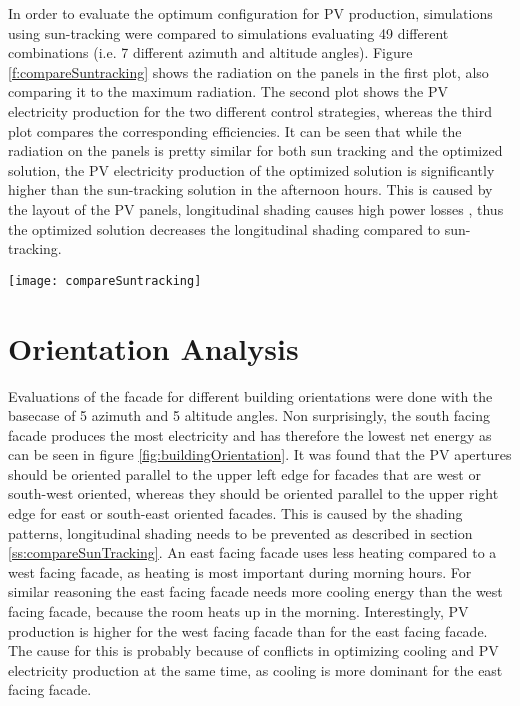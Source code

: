 		In order to evaluate the optimum configuration for PV production, simulations using sun-tracking were compared to simulations evaluating 49 different combinations (i.e. 7 different azimuth and altitude angles). Figure \ref{f:compareSuntracking} shows the radiation on the panels in the first plot, also comparing it to the maximum radiation. The second plot shows the PV electricity production for the two different control strategies, whereas the third plot compares the corresponding efficiencies. It can be seen that while the radiation on the panels is pretty similar for both sun tracking and the optimized solution, the PV electricity production of the optimized solution is significantly higher than the sun-tracking solution in the afternoon hours. This is caused by the layout of the PV panels, longitudinal shading causes high power losses \cite{hofer2015PVSEC}, thus the optimized solution decreases the longitudinal shading compared to sun-tracking. 

		\begin{figure*}
			\begin{center}
			\texttt{[image: compareSuntracking]}
			\caption{Comparison of optimized solution to sun-tracking. a) average radiation on panels compared to radiation without shading b) PV electricity production comparison c) efficiency comparison}
			\label{f:compareSuntracking}
			\end{center}
		\end{figure*}






\section{Orientation Analysis}

	Evaluations of the facade for different building orientations were done with the basecase of 5 azimuth and 5 altitude angles. Non surprisingly, the south facing facade produces the most electricity and has therefore the lowest net energy as can be seen in figure \ref{fig:buildingOrientation}. It was found that the PV apertures should be oriented parallel to the upper left edge for facades that are west or south-west oriented, whereas they should be oriented parallel to the upper right edge for east or south-east oriented facades. This is caused by the shading patterns, longitudinal shading needs to be prevented as described in section \ref{ss:compareSunTracking}. An east facing facade uses less heating compared to a west facing facade, as heating is most important during morning hours. For similar reasoning the east facing facade needs more cooling energy than the west facing facade, because the room heats up in the morning. Interestingly, PV production is higher for the west facing facade than for the east facing facade. The cause for this is probably because of conflicts in optimizing cooling and PV electricity production at the same time, as cooling is more dominant for the east facing facade. 

